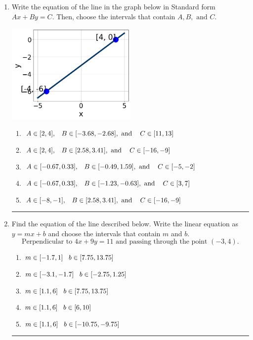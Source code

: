 \documentclass[14pt]{extbook}
\newcommand{\litem}[1]{\item#1\hspace*{-1cm}\rule{\textwidth}{0.4pt}}
\begin{document}
\begin{enumerate}
{\begin{enumerate}[label=\Alph*.]
\end{enumerate} }
\litem{
Write the equation of the line in the graph below in Standard form $Ax+By=C$. Then, choose the intervals that contain $A, B, \text{ and } C$.
\begin{center}
    \includegraphics[width=0.5\textwidth]{../Figures/linearGraphToStandardCopyC.png}
\end{center}
\begin{enumerate}[label=\Alph*.]
\item \( A \in [2, 4], \hspace{3mm} B \in [-3.68, -2.68], \text{ and } \hspace{3mm} C \in [11, 13] \)
\item \( A \in [2, 4], \hspace{3mm} B \in [2.58, 3.41], \text{ and } \hspace{3mm} C \in [-16, -9] \)
\item \( A \in [-0.67, 0.33], \hspace{3mm} B \in [-0.49, 1.59], \text{ and } \hspace{3mm} C \in [-5, -2] \)
\item \( A \in [-0.67, 0.33], \hspace{3mm} B \in [-1.23, -0.63], \text{ and } \hspace{3mm} C \in [3, 7] \)
\item \( A \in [-8, -1], \hspace{3mm} B \in [2.58, 3.41], \text{ and } \hspace{3mm} C \in [-16, -9] \)

\end{enumerate} }
\litem{
Find the equation of the line described below. Write the linear equation as $ y=mx+b $ and choose the intervals that contain $m$ and $b$.\[ \text{Perpendicular to } 4 x + 9 y = 11 \text{ and passing through the point } (-3, 4). \]\begin{enumerate}[label=\Alph*.]
\item \( m \in [-1.7, 1] \hspace*{3mm} b \in [7.75, 13.75] \)
\item \( m \in [-3.1, -1.7] \hspace*{3mm} b \in [-2.75, 1.25] \)
\item \( m \in [1.1, 6] \hspace*{3mm} b \in [7.75, 13.75] \)
\item \( m \in [1.1, 6] \hspace*{3mm} b \in [6, 10] \)
\item \( m \in [1.1, 6] \hspace*{3mm} b \in [-10.75, -9.75] \)


\end{enumerate}}
\end{enumerate}
\end{document}
